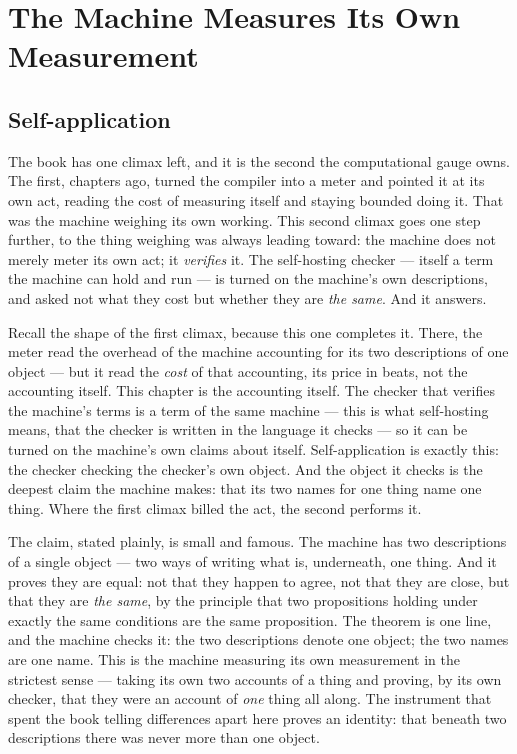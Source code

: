 \chapter{The Machine Measures Its Own Measurement}

\section{Self-application}

The book has one climax left, and it is the second the computational gauge owns. The first, chapters ago, turned the
compiler into a meter and pointed it at its own act, reading the cost of measuring itself and staying bounded doing it.
That was the machine weighing its own working. This second climax goes one step further, to the thing weighing was always
leading toward: the machine does not merely meter its own act; it \emph{verifies} it. The self-hosting checker --- itself
a term the machine can hold and run --- is turned on the machine's own descriptions, and asked not what they cost but
whether they are \emph{the same}. And it answers.

Recall the shape of the first climax, because this one completes it. There, the meter read the overhead of the machine
accounting for its two descriptions of one object --- but it read the \emph{cost} of that accounting, its price in beats,
not the accounting itself. This chapter is the accounting itself. The checker that verifies the machine's terms is a term
of the same machine --- this is what self-hosting means, that the checker is written in the language it checks --- so it
can be turned on the machine's own claims about itself. Self-application is exactly this: the checker checking the
checker's own object. And the object it checks is the deepest claim the machine makes: that its two names for one thing
name one thing. Where the first climax billed the act, the second performs it.

The claim, stated plainly, is small and famous. The machine has two descriptions of a single object --- two ways of
writing what is, underneath, one thing. And it proves they are equal: not that they happen to agree, not that they are
close, but that they are \emph{the same}, by the principle that two propositions holding under exactly the same conditions
are the same proposition. The theorem is one line, and the machine checks it: the two descriptions denote one object; the
two names are one name. This is the machine measuring its own measurement in the strictest sense --- taking its own two
accounts of a thing and proving, by its own checker, that they were an account of \emph{one} thing all along. The
instrument that spent the book telling differences apart here proves an identity: that beneath two descriptions there was
never more than one object.

